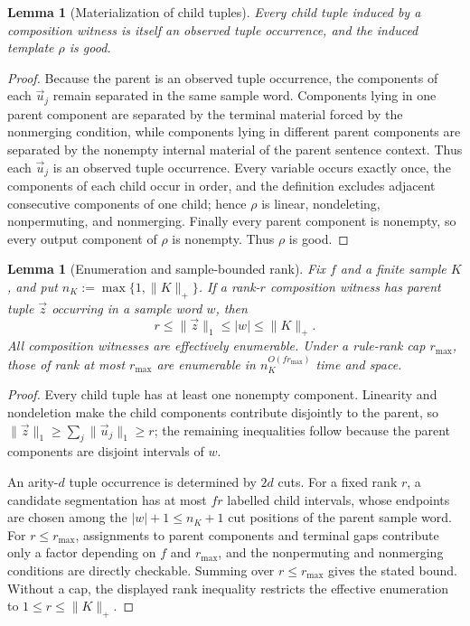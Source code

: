 \documentclass[11pt]{article}
\numberwithin{equation}{section}
\theoremstyle{plain}
\newtheorem{lemma}[theorem]{Lemma}
\theoremstyle{definition}
\theoremstyle{remark}
\newcommand{\tuple}[1]{\vec{#1}}
\begin{document}
\begin{lemma}[Materialization of child tuples]
\label{lem:composition-witness-materialization}
Every child tuple induced by a composition witness is itself an observed tuple
occurrence, and the induced template $\rho$ is good.
\end{lemma}

\begin{proof}
Because the parent is an observed tuple occurrence, the components of each
$\tuple u_j$ remain separated in the same sample word.  Components lying in one
parent component are separated by the terminal material forced by the
nonmerging condition, while components lying in different parent components
are separated by the nonempty internal material of the parent sentence
context.  Thus each $\tuple u_j$ is an observed tuple occurrence.  Every
variable occurs exactly once, the components of each child occur in order, and
the definition excludes adjacent consecutive components of one child; hence
$\rho$ is linear, nondeleting, nonpermuting, and nonmerging.  Finally every
parent component is nonempty, so every output component of $\rho$ is nonempty.
Thus $\rho$ is good.
\end{proof}

\begin{lemma}[Enumeration and sample-bounded rank]
\label{lem:general-witness-enumeration}
Fix $f$ and a finite sample $K$, and put $n_K:=\max\{1,\|K\|_+\}$.  If a
rank-$r$ composition witness has parent tuple $\tuple z$ occurring in a sample
word $w$, then
\[
  r\le\|\tuple z\|_1\le |w|\le\|K\|_+.
\]
All composition witnesses are effectively enumerable.  Under a rule-rank cap
$r_{\max}$, those of rank at most $r_{\max}$ are enumerable in
$n_K^{O(f r_{\max})}$ time and space.
\end{lemma}

\begin{proof}
Every child tuple has at least one nonempty component.  Linearity and
nondeletion make the child components contribute disjointly to the parent, so
$\|\tuple z\|_1\ge\sum_j\|\tuple u_j\|_1\ge r$; the remaining inequalities
follow because the parent components are disjoint intervals of $w$.

An arity-$d$ tuple occurrence is determined by $2d$ cuts.  For a fixed rank
$r$, a candidate segmentation has at most $fr$ labelled child intervals, whose endpoints are chosen among the $|w|+1\le n_K+1$ cut positions of
the parent sample word.  For $r\le r_{\max}$, assignments to parent components and
terminal gaps contribute only a factor depending on $f$ and $r_{\max}$, and
the nonpermuting and nonmerging conditions are directly checkable.  Summing
over $r\le r_{\max}$ gives the stated bound.  Without a cap, the displayed
rank inequality restricts the effective enumeration to
$1\le r\le\|K\|_+$.
\end{proof}
\end{document}
